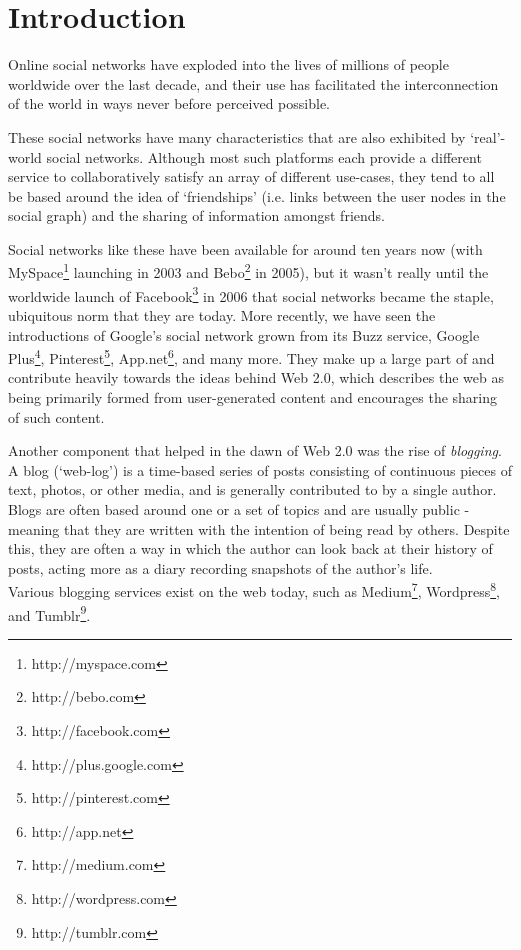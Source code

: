 \chapter{Introduction}

Online social networks have exploded into the lives of millions of people worldwide over the last decade, and their use has facilitated the interconnection of the world in ways never before perceived possible.

These social networks have many characteristics that are also exhibited by `real'-world social networks. Although most such platforms each provide a different service to collaboratively satisfy an array of different use-cases, they tend to all be based around the idea of `friendships' (i.e. links between the user nodes in the social graph) and the sharing of information amongst friends.

Social networks like these have been available for around ten years now (with MySpace\footnote{http://myspace.com} launching in 2003 and Bebo\footnote{http://bebo.com} in 2005), but it wasn't really until the worldwide launch of Facebook\footnote{http://facebook.com} in 2006 that social networks became the staple, ubiquitous norm that they are today. More recently, we have seen the introductions of Google's social network grown from its Buzz service, Google Plus\footnote{http://plus.google.com}, Pinterest\footnote{http://pinterest.com}, App.net\footnote{http://app.net}, and many more. They make up a large part of and contribute heavily towards the ideas behind Web 2.0, which describes the web as being primarily formed from user-generated content and encourages the sharing of such content.

Another component that helped in the dawn of Web 2.0 was the rise of \textit{blogging}. A blog (`web-log') is a time-based series of posts consisting of continuous pieces of text, photos, or other media, and is generally contributed to by a single author. Blogs are often based around one or a set of topics and are usually public - meaning that they are written with the intention of being read by others. Despite this, they are often a way in which the author can look back at their history of posts, acting more as a diary recording snapshots of the author's life.\\
Various blogging services exist on the web today, such as Medium\footnote{http://medium.com}, Wordpress\footnote{http://wordpress.com}, and Tumblr\footnote{http://tumblr.com}.


